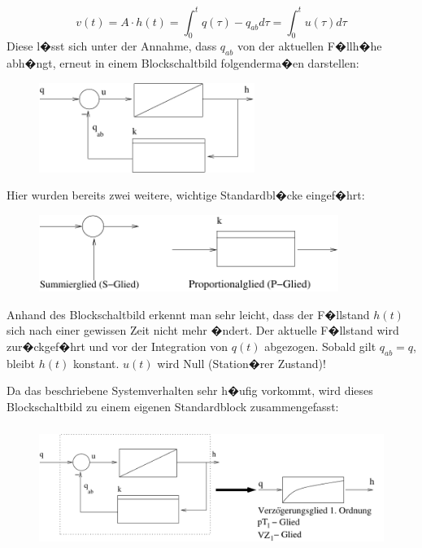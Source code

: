 \documentclass[12pt,a4paper,ngerman]{scrartcl}
\begin{document}
\begin{equation*}
 v(t)= A \cdot h(t)=\int_0^t{q(\tau)-q_{ab}d\tau}=\int_0^t{u(\tau)d\tau} 
\end{equation*}
Diese l�sst sich unter der Annahme, dass $q_{ab}$ von der aktuellen F�llh�he abh�ngt, erneut in einem Blockschaltbild folgenderma�en darstellen:
\begin{figure}[H]
\includegraphics[width=7cm]{sysregel_bsb2}
\end{figure}
Hier wurden bereits zwei weitere, wichtige Standardbl�cke eingef�hrt:
\begin{figure}[H]
\includegraphics[height=2.5cm]{sysregel_spglied}
\end{figure}
Anhand des Blockschaltbild erkennt man sehr leicht, dass der F�llstand $h(t)$ sich nach einer gewissen Zeit nicht mehr �ndert. Der aktuelle F�llstand wird zur�ckgef�hrt und vor der Integration von $q(t)$ abgezogen. Sobald gilt $q_{ab}=q$, bleibt $h(t)$ konstant. $u(t)$ wird Null (Station�rer Zustand)!

Da das beschriebene Systemverhalten sehr h�ufig vorkommt, wird dieses Blockschaltbild zu einem eigenen Standardblock zusammengefasst:
\begin{figure}[H]
\includegraphics[height=4cm]{sysregel_pt1}
\end{figure}
\end{document}
